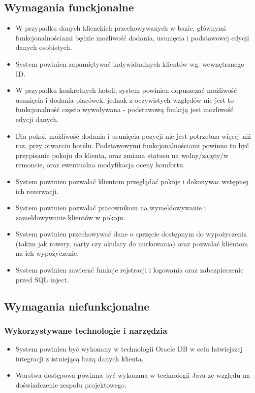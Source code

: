 \documentclass[]{article}
\begin{document}
	\subsection{Wymagania funckjonalne}
	\begin{itemize}
		\item W przypadku danych klienckich przechowywanych w bazie, głównymi funkcjonalnościami będzie możliwość dodania, usunięcia i podstawowej edycji danych osobistych.
		\item System powinien zapamiętywać indywidualnych klientów wg. wewnętrznego ID.
		\item W przypadku konkretnych hoteli, system powinien dopuszczać możliwość usunięcia i dodania placówek, jednak z oczywistych względów nie jest to funkcjonalność często wywoływana - podstawową funkcją jest możliwość edycji danych.
		\item Dla pokoi, możliwość dodania i usunięcia pozycji nie jest potrzebna więcej niż raz, przy otwarciu hotelu. Podstawowymi funkcjonalnościami powinno tu być przypisanie pokoju do klienta, oraz zmiana statusu na wolny/zajęty/w remoncie, oraz ewentualna modyfikacja oceny komfortu.
		\item System powinien pozwalać klientom przeglądać pokoje i dokonywac wstępnej ich rezerwacji.
		\item System powinien pozwalać pracownikom na wymeldowywanie i zameldowywanie klientów w pokoju.
		\item System powinien przechowywać dane o sprzęcie dostępnym do wypożyczenia (takim jak rowery, narty czy okulary do nurkowania) oraz pozwalać klientom na ich wypożyczenie.
		\item System powinien zawierać funkcje rejstracji i logowania oraz zabezpieczenie przed SQL inject.
	\end{itemize}
	\newpage
	\subsection{Wymagania niefunkcjonalne}
	\subsubsection{Wykorzystywane technologie i narzędzia}
	\begin{itemize} 
	\item System powinien być wykonany w technologii Oracle DB w celu łatwiejszej
	integracji z istniejącą bazą danych klienta.
	\item Warstwa dostępowa powinna być wykonana w technologii Java ze względu na
	doświadczenie zespołu projektowego.
	\end{itemize}
\end{document}
